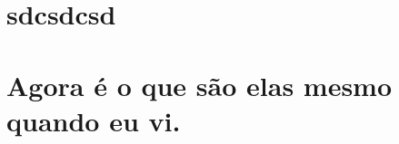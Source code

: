 \documentclass{memoir}
\begin{document}
\chapter{sdcsdcsd}

\lipsum[1-4]

\chapter{Agora é o que são elas mesmo quando eu vi.}

\lipsum[1-4]
\end{document}

